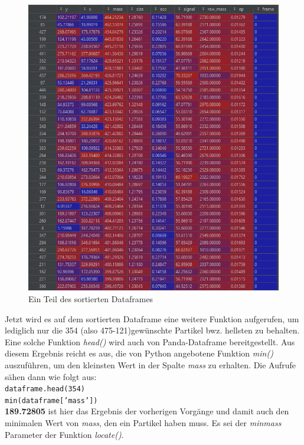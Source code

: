\begin{enumerate}
\begin{figure}[H]
    \centering
    \includegraphics[scale=0.45]{Grafiken/trackpyBilder/df_sorted.png}
    \caption{Ein Teil des sortierten Dataframes}
\end{figure}

Jetzt wird es auf dem sortierten Dataframe eine weitere Funktion aufgerufen, um lediglich nur die 354 (also 475-121)gewünschte Partikel bwz. hellsten zu behalten. Eine solche Funktion \textit{head()} wird auch von Panda-Dataframe bereitgestellt. Aus diesem Ergebnis reicht es aus, die von Python angebotene Funktion \textit{min()} auszuführen, um den kleinsten Wert in der Spalte \textit{mass} zu erhalten. 
Die Aufrufe sähen dann wie folgt aus:\\
\texttt{dataframe.head(354)} \\
\texttt{min(dataframe['mass'])}\\

\textbf{189.72805} ist hier das Ergebnis der vorherigen Vorgänge und damit auch den minimalen Wert von \textit{mass}, den ein Partikel haben muss. Es sei der \textit{minmass} Parameter der Funktion \textit{locate()}.




\end{enumerate}

